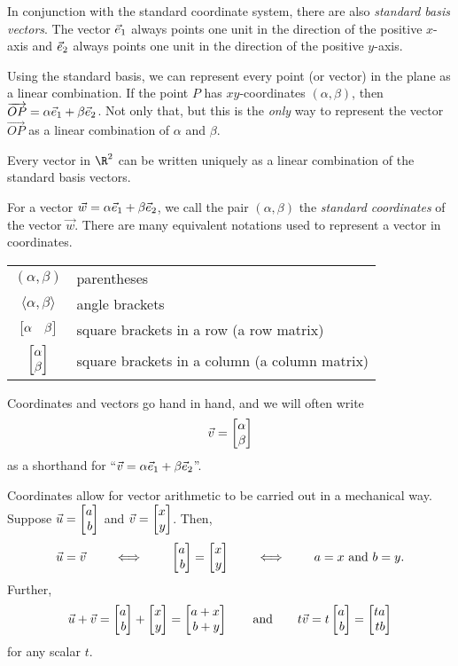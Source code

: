 In conjunction with the standard coordinate system, there are also \emph{standard basis vectors}.
The vector ${\vec e_1}$ always points one unit in the direction of the positive $x$-axis and ${\vec e_2}$
always points one unit in the direction of the positive $y$-axis.

Using the standard basis, we can represent every point (or vector) in the plane 
as a linear combination. If the point $P$ has $xy$-coordinates $(\alpha,\beta)$, then
$\overrightarrow{OP}=\alpha{\vec e_1}+\beta{\vec e_2}$. Not only that, but this is the
\emph{only} way to represent the vector $\overrightarrow{OP}$ as a linear combination of
$\alpha$ and $\beta$.

\begin{emphbox}[Takeaway]
	Every vector in $\R^2$ can be written uniquely as a linear combination of the standard basis vectors.
\end{emphbox}

For a vector $\vec w=\alpha{\vec e_1}+\beta{\vec e_2}$,
we call the pair $(\alpha,\beta)$  the
\emph{standard coordinates} of the vector $\vec w$.  There
are many equivalent notations used to represent a vector in coordinates.
\begin{center}
	\begin{tabular}{c p{7cm}}
		$(\alpha,\beta)$ & parentheses\\
		$\langle \alpha,\beta\rangle$ & angle brackets\\
		$\mat{\alpha&\beta}$ & square brackets in a row (a row matrix)\\
		$\mat{\alpha\\\beta}$ & square brackets in a column (a column matrix)\\
	\end{tabular}
\end{center}

Coordinates and vectors go hand in hand, and we will often write
\[
	\vec v=\mat{\alpha\\\beta}
\]
as a shorthand for ``$\vec v=\alpha{\vec e_1}+\beta{\vec e_2}$''.


Coordinates allow for vector arithmetic to be carried out in a mechanical way.
 Suppose $\vec u=\mat{a\\b}$ and $\vec v=\mat{x\\y}$.
Then,
\[
	\vec u=\vec v\qquad\iff\qquad \mat{a\\b}=\mat{x\\y}\qquad\iff\qquad a=x\text{ and }b=y.
\]
Further,
\[
	\vec u+\vec v=\mat{a\\b}+\mat{x\\y}=\mat{a+x\\b+y}\qquad\text{and}\qquad t\vec v=t\mat{a\\b}=\mat{ta\\tb}
\]
for any scalar $t$.

